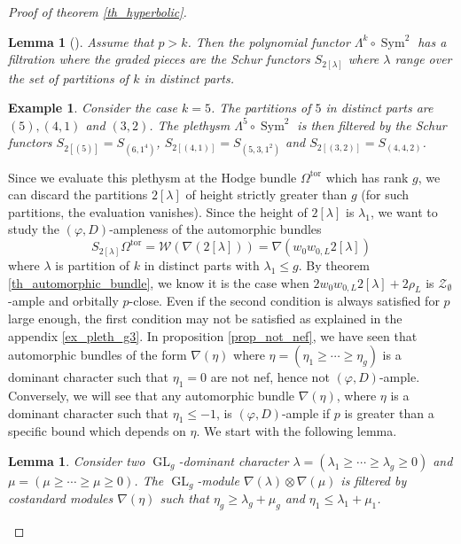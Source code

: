\documentclass[11pt]{amsart}
\numberwithin{subsection}{section}
\numberwithin{figure}{section}
\numberwithin{table}{section}
\theoremstyle{1}
\newtheorem{lemma}[theorem]{Lemma}
\theoremstyle{2}
\newtheorem{example}[theorem]{Example}
\DeclareMathOperator{\GL}{GL}
\DeclareMathOperator{\Sym}{Sym}
\DeclareMathOperator{\tor}{tor}
\begin{document}
\begin{proof}[Proof of theorem \ref{th_hyperbolic}]
\begin{lemma}[{\cite[Lemma 7]{MR2497590}}]
Assume that $p > k$. Then the polynomial functor $\Lambda^k \circ \Sym^2$ has a filtration where the graded pieces are the Schur functors $S_{2[\lambda]}$ where $\lambda$ range over the set of partitions of $k$ in distinct parts.
\end{lemma}
\begin{example}
Consider the case $k = 5$. The partitions of $5$ in distinct parts are $(5), (4,1)$ and $(3,2)$. The plethysm $\Lambda^5 \circ \Sym^2$ is then filtered by the Schur functors $S_{2[(5)]} = S_{(6,1^4)}$, $S_{2[(4,1)]} = S_{(5,3,1^2)}$ and $S_{2[(3,2)]} = S_{(4,4,2)}$.
\end{example}
\vspace{0.2cm}
Since we evaluate this plethysm at the Hodge bundle $\Omega^{\tor}$ which has rank $g$, we can discard the partitions $2[\lambda]$ of height strictly greater than $g$ (for such partitions, the evaluation vanishes). Since the height of $2[\lambda]$ is $\lambda_1$, we want to study the $(\varphi,D)$-ampleness of the automorphic bundles
\begin{equation*}
S_{2[\lambda]}\Omega^{\tor} = \mathcal{W}(\nabla(2[\lambda])) = \nabla(w_0w_{0,L}2[\lambda])
\end{equation*}
where $\lambda$ is partition of $k$ in distinct parts with $\lambda_1 \leq g$. By theorem \ref{th_automorphic_bundle}, we know it is the case when $2w_0w_{0,L}2[\lambda]+ 2\rho_L$ is $\mathcal{Z}_{\emptyset}$-ample and orbitally $p$-close. Even if the second condition is always satisfied for $p$ large enough, the first condition may not be satisfied as explained in the appendix \ref{ex_pleth_g3}. In proposition \ref{prop_not_nef}, we have seen that automorphic bundles of the form $\nabla(\eta)$ where $\eta = (\eta_1 \geq \cdots \geq \eta_g)$ is a dominant character such that $\eta _1= 0$ are not nef, hence not $(\varphi,D)$-ample. Conversely, we will see that any automorphic bundle $\nabla(\eta)$, where $\eta$ is a dominant character such that $\eta_1 \leq -1$, is $(\varphi,D)$-ample if $p$ is greater than a specific bound which depends on $\eta$. We start with the following lemma.
\begin{lemma}\label{lem8}
Consider two $\GL_g$-dominant character $\lambda = (\lambda_1 \geq \cdots \geq \lambda_g \geq 0)$ and $\mu = (\mu \geq \cdots \geq \mu \geq 0)$. The $\GL_g$-module $\nabla(\lambda)\otimes \nabla(\mu)$ is filtered by costandard modules $\nabla(\eta)$ such that $\eta_g \geq \lambda_g + \mu_g$ and  $\eta_1 \leq \lambda_1 + \mu_1$.

\end{lemma}
\end{proof}
\end{document}

